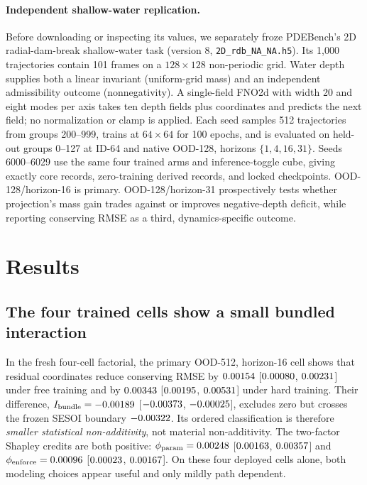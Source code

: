 \documentclass{article}
\newcommand{\phiP}{\phi_{\mathrm{param}}}
\newcommand{\phiE}{\phi_{\mathrm{enforce}}}
\begin{document}
\paragraph{Independent shallow-water replication.}
Before downloading or inspecting its values, we separately froze PDEBench's 2D radial-dam-break
shallow-water task (version 8, \texttt{2D\_rdb\_NA\_NA.h5}). Its 1,000 trajectories contain 101
frames on a $128\times128$ non-periodic grid. Water depth supplies both a linear invariant
(uniform-grid mass) and an independent admissibility outcome (nonnegativity). A single-field FNO2d
with width 20 and eight modes per axis takes ten depth fields plus coordinates and predicts the
next field; no normalization or clamp is applied. Each seed samples 512 trajectories from groups
200--999, trains at $64\times64$ for 100 epochs, and is evaluated on held-out groups 0--127 at
ID-64 and native OOD-128, horizons $\{1,4,16,31\}$. Seeds 6000--6029 use the same four trained
arms and inference-toggle cube, giving exactly \SWECoreRecords{} core records,
\SWEDerivedRecords{} zero-training derived records, and \SWECheckpoints{} locked checkpoints.
OOD-128/horizon-16 is primary. OOD-128/horizon-31 prospectively tests whether projection's mass
gain trades against or improves negative-depth deficit, while reporting conserving RMSE as a
third, dynamics-specific outcome.

\section{Results}
\label{sec:results}

\subsection{The four trained cells show a small bundled interaction}

In the fresh four-cell factorial, the primary
OOD-512, horizon-16 cell shows that residual coordinates reduce conserving RMSE by
$0.00154$ [$0.00080$, $0.00231$] under free training and by
$0.00343$ [$0.00195$, $0.00531$] under hard training. Their difference,
$I_{\mathrm{bundle}}=-0.00189$ [$-0.00373$,
$-0.00025$], excludes zero but crosses the frozen SESOI boundary
$-0.00322$. Its ordered classification is therefore \emph{smaller statistical non-additivity}, not
material non-additivity. The two-factor Shapley credits are both positive:
$\phiP=\FactorPhiParameterization$ [$0.00163$,
$0.00357$] and $\phiE=\FactorPhiEnforcement$
[$0.00023$, $0.00167$]. On these four deployed cells alone,
both modeling choices appear useful and only mildly path dependent.
\end{document}
